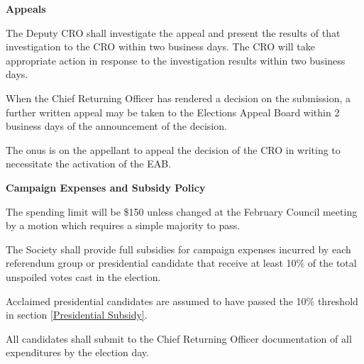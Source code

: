 \begin{longenum}[label*=\arabic*., align=left]
 \item \textbf{Appeals}
 \begin{longenum}[label*=\arabic*., align=left]
 \item The Deputy CRO shall investigate the appeal and present the results of that investigation to the CRO within  two business days. The CRO will  take appropriate action in response  to  the investigation results within two business days.
\item  When  the  Chief  Returning  Officer  has  rendered  a  decision  on  the  submission,  a  further  written appeal may be taken to the Elections Appeal Board within 2 business days of the announcement of the decision.
\item The onus is on the appellant to appeal the decision of the CRO in writing to necessitate the activation of the EAB.
  \end{longenum}
  \item \textbf{Campaign Expenses and Subsidy Policy}	
  \begin{longenum}[label*=\arabic*., align=left]
  \item The spending limit will be \$150 unless changed at the February Council meeting by a motion which requires a simple majority to pass.
\item \label{Presidential Subsidy}The Society shall provide full subsidies for campaign expenses incurred by each referendum group or presidential candidate that receive at least 10\% of the total unspoiled votes cast in the election.  
			\begin{longenum}[label*=\arabic*., align=left]
			\item  Acclaimed  presidential  candidates  are  assumed  to  have  passed  the  10\%  threshold  in section \ref{Presidential Subsidy}.
			\end{longenum}
\item All candidates shall submit to the Chief Returning Officer documentation of all expenditures by the election day.
 \end{longenum}
\end{longenum}